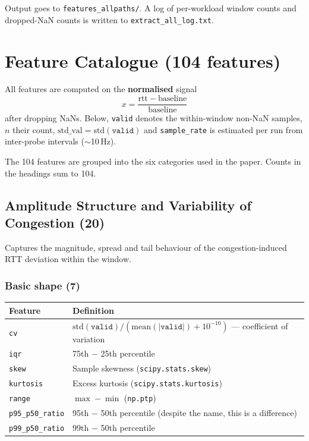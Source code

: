\documentclass[11pt,a4paper]{article}
\begin{document}
Output goes to \texttt{features\_allpaths/}. A log of per-workload window
counts and dropped-NaN counts is written to \texttt{extract\_all\_log.txt}.

\section{Feature Catalogue (104 features)}

All features are computed on the \textbf{normalised} signal
\[
x = \frac{\mathrm{rtt} - \mathrm{baseline}}{\mathrm{baseline}}
\]
after dropping NaNs. Below, \texttt{valid} denotes the within-window non-NaN
samples, $n$ their count, $\mathrm{std\_val} = \mathrm{std}(\texttt{valid})$
and \texttt{sample\_rate} is estimated per run from inter-probe intervals
($\sim$10\,Hz).

The 104 features are grouped into the six categories used in the paper.
Counts in the headings sum to 104.

\subsection{Amplitude Structure and Variability of Congestion (20)}

Captures the magnitude, spread and tail behaviour of the
congestion-induced RTT deviation within the window.

\subsubsection*{Basic shape (7)}

\begin{tabular}{@{}lp{10cm}@{}}
\toprule
\textbf{Feature} & \textbf{Definition} \\
\midrule
\texttt{cv}             & $\mathrm{std}(\texttt{valid}) / (\mathrm{mean}(|\texttt{valid}|) + 10^{-10})$ --- coefficient of variation \\
\texttt{iqr}            & 75th $-$ 25th percentile \\
\texttt{skew}           & Sample skewness (\texttt{scipy.stats.skew}) \\
\texttt{kurtosis}       & Excess kurtosis (\texttt{scipy.stats.kurtosis}) \\
\texttt{range}          & $\max - \min$ (\texttt{np.ptp}) \\
\texttt{p95\_p50\_ratio}& 95th $-$ 50th percentile (despite the name, this is a difference) \\
\texttt{p99\_p50\_ratio}& 99th $-$ 50th percentile \\
\bottomrule
\end{tabular}
\end{document}
